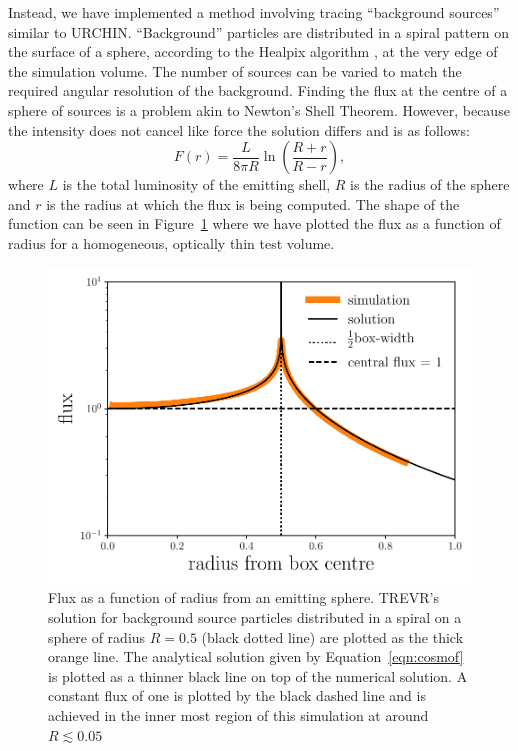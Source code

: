 \documentclass[fleq,usenatbib]{mnras}
\newcommand{\acro}{TREVR}
\begin{document}
{Instead, we have implemented a method involving tracing ``background sources'' 
similar to URCHIN. ``Background'' particles are distributed in a spiral 
pattern on the surface of a sphere, according to the Healpix algorithm 
\citep{gorskiEt05}, at the very edge of the simulation volume. The number of 
sources can be varied to match the required angular resolution of the 
background. Finding the flux at the centre of a sphere of sources is a problem 
akin to Newton's Shell Theorem. However, because the intensity does not cancel 
like force the solution differs and is as follows:
\begin{equation}
\label{eqn:cosmof}
F(r) = \frac{L}{8\pi R} \ln \left(\frac{R+r}{R-r}\right),
\end{equation}
where $L$ is the total luminosity of the emitting shell, $R$ is the radius of 
the sphere and $r$ is the radius at which the flux is being computed. The 
shape of the function can be seen in Figure~\ref{fig:cosmof} where we have 
plotted the flux as a function of radius for a homogeneous, optically thin 
test volume.
\begin{figure}
\includegraphics[width=1\linewidth]{Figures/cosmofield.pdf}
\caption{Flux as a function of radius from an emitting sphere. \acro{}'s 
solution for background source particles distributed in a spiral on a sphere 
of radius $R=0.5$ (black dotted line) are plotted as the thick orange line. 
The analytical solution given by Equation~\ref{eqn:cosmof} is plotted as a 
thinner black line on top of the numerical solution. A constant flux of one is 
plotted by the black dashed line and is achieved in the inner most region of 
this simulation at around $R \lesssim 0.05$}
\label{fig:cosmof}
\end{figure}

}
\end{document}
